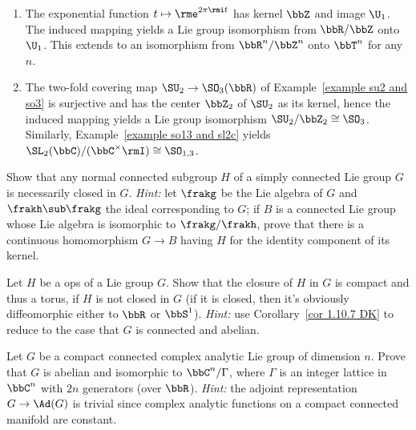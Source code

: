 \begin{example}
    \begin{enumerate}
        \item The exponential function $t\mapsto \rme^{2\pi\rmi t}$ has kernel $\bbZ$ and image $\U_1$. The induced mapping yields a Lie group isomorphism from $\bbR\slash \bbZ$ onto $\U_1$. This extends to an isomorphism from $\bbR^n\slash\bbZ^n$ onto $\bbT^n$ for any $n$.
        \item The two-fold covering map $\SU_2\to \SO_3(\bbR)$ of Example~\ref{example su2 and so3} is surjective and has the center $\bbZ_2$ of $\SU_2$ as its kernel, hence the induced mapping yields a Lie group isomorphism $\SU_2\slash\bbZ_2\cong \SO_3$. Similarly, Example~\ref{example so13 and sl2c} yields $\SL_2(\bbC)\slash (\bbC^\times \rmI)\cong \SO_{1,3}$.
    \end{enumerate}
\end{example}



\begin{xca}
    Show that any normal connected subgroup $H$ of a simply connected Lie group $G$ is necessarily closed in $G$. \emph{Hint:} let $\frakg$ be the Lie algebra of $G$ and $\frakh\sub\frakg$ the ideal corresponding to $G$; if $B$ is a connected Lie group whose Lie algebra is isomorphic to $\frakg\slash\frakh$, prove that there is a continuous homomorphism $G\to B$ having $H$ for the identity component of its kernel.
\end{xca}

\begin{xca}
    Let $H$ be a \gls{ops} of a Lie group $G$. Show that the closure of $H$ in $G$ is compact and thus a torus, if $H$ is not closed in $G$ (if it is closed, then it's obviously diffeomorphic either to $\bbR$ or $\bbS^1$). \emph{Hint:} use Corollary~\ref{cor 1.10.7 DK} to reduce to the case that $G$ is connected and abelian.
\end{xca}

\begin{xca}
    Let $G$ be a compact connected complex analytic Lie group of dimension $n$. Prove that $G$ is abelian and isomorphic to $\bbC^n\slash\Gamma$, where $\Gamma$ is an integer lattice in $\bbC^n$ with $2n$ generators (over $\bbR$). \emph{Hint:} the adjoint representation $G\to \Ad(G)$ is trivial since complex analytic functions on a compact connected manifold are constant.
\end{xca}









